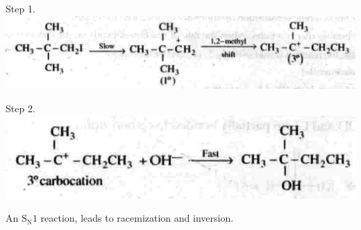 \documentclass[10pt]{article}
\begin{document}
Step 1.\\
\includegraphics[max width=\textwidth, center]{2025_01_28_8470952b98110cec3aabg-092(3)}

Step 2.\\
\includegraphics[max width=\textwidth, center]{2025_01_28_8470952b98110cec3aabg-092(1)}

An $\mathrm{S}_{\mathrm{N}} 1$ reaction, leads to racemization and inversion.
\end{document}
